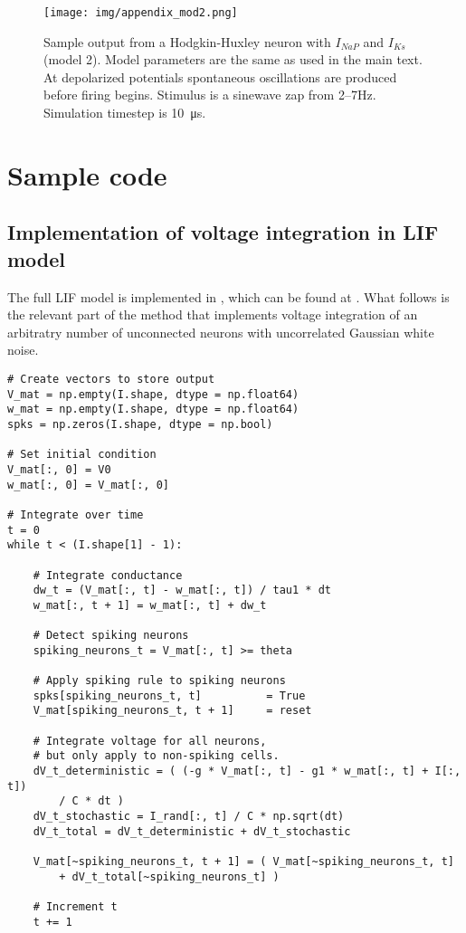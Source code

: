 \documentclass[12pt]{article}
\begin{document}
\begin{figure}
    \texttt{[image: img/appendix\_mod2.png]}
    \caption[Sample traces from neuron with $I_{NaP}$ and $I_{Ks}$]{
        Sample output from a Hodgkin-Huxley neuron with $I_{NaP}$ and $I_{Ks}$ (model 2).
        Model parameters are the same as used in the main text.
        At depolarized potentials spontaneous oscillations are produced before firing begins.
        Stimulus is a sinewave zap from 2--7Hz.
        Simulation timestep is \SI{10}{\micro\s}.
        }
    \label{fig:appendix_mod2}
\end{figure}


\section{Sample code}

\subsection{Implementation of voltage integration in LIF model}

The full LIF model is implemented in , which can be found at .
What follows is the relevant part of the  method that implements voltage integration of an arbitratry number of unconnected neurons with uncorrelated Gaussian white noise.

\begin{verbatim}
# Create vectors to store output
V_mat = np.empty(I.shape, dtype = np.float64)
w_mat = np.empty(I.shape, dtype = np.float64)
spks = np.zeros(I.shape, dtype = np.bool)

# Set initial condition
V_mat[:, 0] = V0
w_mat[:, 0] = V_mat[:, 0]

# Integrate over time
t = 0
while t < (I.shape[1] - 1):

    # Integrate conductance
    dw_t = (V_mat[:, t] - w_mat[:, t]) / tau1 * dt
    w_mat[:, t + 1] = w_mat[:, t] + dw_t

    # Detect spiking neurons
    spiking_neurons_t = V_mat[:, t] >= theta

    # Apply spiking rule to spiking neurons
    spks[spiking_neurons_t, t]          = True
    V_mat[spiking_neurons_t, t + 1]     = reset

    # Integrate voltage for all neurons,
    # but only apply to non-spiking cells.
    dV_t_deterministic = ( (-g * V_mat[:, t] - g1 * w_mat[:, t] + I[:, t])
        / C * dt )
    dV_t_stochastic = I_rand[:, t] / C * np.sqrt(dt)
    dV_t_total = dV_t_deterministic + dV_t_stochastic

    V_mat[~spiking_neurons_t, t + 1] = ( V_mat[~spiking_neurons_t, t]
        + dV_t_total[~spiking_neurons_t] )

    # Increment t
    t += 1
\end{verbatim}
\end{document}

